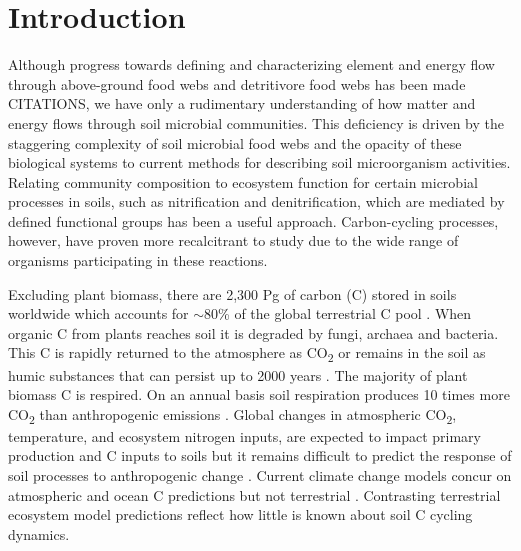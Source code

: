 \section{Introduction}
Although progress towards defining and characterizing element and energy flow through above-ground food webs and detritivore food webs has been made CITATIONS, we have only a rudimentary understanding of how matter and energy flows through soil microbial communities. This deficiency is driven by the staggering complexity of soil microbial food webs and the opacity of these biological systems to current methods for describing soil microorganism activities. Relating community composition to ecosystem function for certain microbial processes in soils, such as nitrification and denitrification, which are mediated by defined functional groups has been a useful approach. Carbon-cycling processes, however, have proven more recalcitrant to study due to the wide range of organisms participating in these reactions.
 
Excluding plant biomass, there are 2,300 Pg of carbon (C) stored in soils worldwide which accounts for $\sim$80\% of the global terrestrial C pool \cite{Amundson_2001,Mendelsohn_2001,IPCC2007Synth,elsen_Ayres_Wall_Bardgett_2011,Lal_2008,BATJES_1996,Lal_2008}. When organic C from plants reaches soil it is degraded by fungi, archaea and bacteria. This C is rapidly returned to the atmosphere as CO\textsubscript{2} or remains in the soil as humic substances that can persist up to 2000 years \cite{yanagita1990natural}. The majority of plant biomass C is respired. On an annual basis soil respiration produces 10 times more CO\textsubscript{2} than anthropogenic emissions \cite{chapin2002principles}. Global changes in atmospheric CO\textsubscript{2}, temperature, and ecosystem nitrogen inputs, are expected to impact primary production and C inputs to soils \citep{Groenigen_2006} but it remains difficult to predict the response of soil processes to anthropogenic change \cite{DAVIDSON_2006}. Current climate change models concur on atmospheric and ocean C predictions but not terrestrial \cite{Friedlingstein_2006}. Contrasting terrestrial ecosystem model predictions reflect how little is known about soil C cycling dynamics. 

